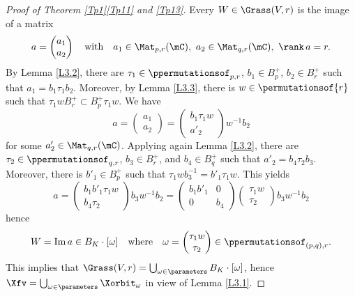 \begin{proof}[Proof of Theorem \ref{Tp1}\ref{Tp11} and \ref{Tp13}]
Every $W\in\Grass(V,r)$ is the image of a matrix
\[a=\begin{pmatrix} a_1\\ a_2 \end{pmatrix}\quad\mbox{with}\quad a_1\in\Mat_{p,r}(\mC),\ a_2\in\Mat_{q,r}(\mC),\ \rank\,a=r.\]
By Lemma \ref{L3.2}, there are $\tau_1\in \ppermutationsof_{p,r}$,
$b_1\in B_p^+$, $b_2\in B_r^+$ such that $a_1=b_1\tau_1b_2$. Moreover, by Lemma \ref{L3.3}, there is $w\in\permutationsof{r}$ such that $\tau_1wB_r^+\subset B_p^+\tau_1w$. We have
\[
a=\begin{pmatrix} a_1\\ a_2 \end{pmatrix}= \begin{pmatrix} b_1\tau_1w\\ a'_2\end{pmatrix}w^{-1}b_2
\]
for some $a'_2\in\Mat_{q,r}(\mC)$. Applying again Lemma \ref{L3.2}, there are $\tau_2\in\ppermutationsof_{q,r}$, $b_3\in B_r^+$, and $b_4\in B_q^+$ such that $a'_2=b_4\tau_2b_3$. Moreover, there is $b'_1\in B_p^+$ such that $\tau_1wb_3^{-1}=b'_1\tau_1w$. This yields
\[a=\begin{pmatrix} b_1b'_1\tau_1w\\ b_4\tau_2\end{pmatrix}b_3w^{-1}b_2=\begin{pmatrix} b_1b'_1 & 0\\ 0 & b_4\end{pmatrix}\begin{pmatrix}\tau_1w\\ \tau_2\end{pmatrix}b_3w^{-1}b_2\]
hence
\[
W=\mathrm{Im}\,a\in B_K\cdot[\omega]\quad\mbox{where}\quad \omega=\begin{pmatrix} \tau_1w\\ \tau_2\end{pmatrix}\in\ppermutationsof_{(p,q),r}.
\]
This implies that $\Grass(V,r)=\bigcup_{\omega\in\parameters}B_K\cdot[\omega]$, hence $\Xfv=\bigcup_{\omega\in\parameters}\Xorbit_\omega$ in view of Lemma \ref{L3.1}.


\end{proof}
